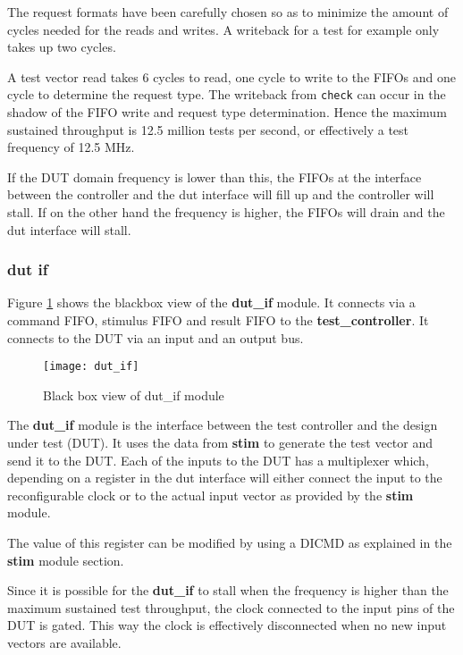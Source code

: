 The request formats have been carefully chosen so as to minimize the amount of cycles
needed for the reads and writes. A writeback for a test for example only takes up two cycles.

A test vector read takes 6 cycles to read, one cycle to write to the FIFOs and one
cycle to determine the request type. The writeback from \texttt{check} can occur in the shadow of the FIFO write
and request type determination. Hence the maximum sustained throughput is 12.5 million tests per second, or
effectively a test frequency of 12.5 MHz.

If the DUT domain frequency is lower than this, the FIFOs at the interface between the controller and the
dut interface will fill up and the controller will stall. If on the other hand the frequency is higher, the FIFOs
will drain and the dut interface will stall.



\subsubsection{dut if}
Figure \ref{fig:bb_dut_if} shows the blackbox view of the \textbf{dut\_if} module. It connects via a command FIFO, stimulus FIFO
and result FIFO to the \textbf{test\_controller}. It connects to the DUT via an input and an output bus.


\begin{figure}
 \centering
 \texttt{[image: dut\_if]}
 \caption{Black box view of dut\_if module}
 \label{fig:bb_dut_if}
\end{figure}


The \textbf{dut\_if} module is the interface between the test controller and the design under test (DUT).
It uses the data from \textbf{stim} to generate the test vector and send it to the DUT. Each of the inputs
to the DUT has a multiplexer which, depending on a register in the dut interface will either connect the
input to the reconfigurable clock or to the actual input vector as provided by the \textbf{stim} module.

The value of this register can be modified by using a DICMD as explained in the \textbf{stim} module section.

Since it is possible for the \textbf{dut\_if} to stall when the frequency is higher than the maximum sustained
test throughput, the clock connected to the input pins of the DUT is gated. This way the clock is effectively
disconnected when no new input vectors are available.

